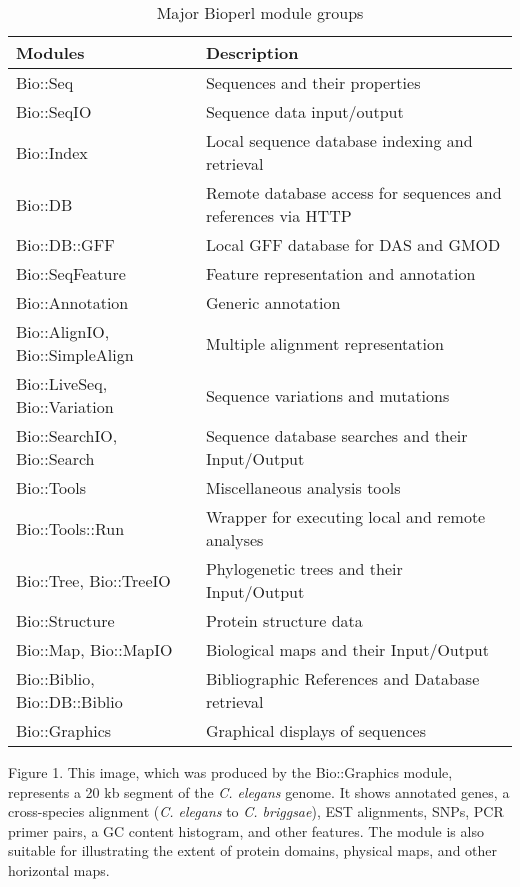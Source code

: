 \documentclass[12pt]{article}
\begin{document}
\begin{table}[h]
\begin{tabular}{|l|l|}
\hline
\textbf{Modules} & \textbf{Description} \\
\hline
Bio::Seq &  Sequences and their properties \\
Bio::SeqIO & Sequence data input/output \\
Bio::Index & Local sequence database indexing and retrieval \\ 
Bio::DB & Remote database access for sequences and references via HTTP \\
Bio::DB::GFF & Local GFF database for DAS and GMOD \\
Bio::SeqFeature & Feature representation and annotation \\
Bio::Annotation & Generic annotation \\
Bio::AlignIO, Bio::SimpleAlign & Multiple alignment representation \\
Bio::LiveSeq, Bio::Variation & Sequence variations and mutations \\
Bio::SearchIO, Bio::Search  & Sequence database searches and their Input/Output \\
Bio::Tools &  Miscellaneous analysis tools \\
Bio::Tools::Run &  Wrapper for executing local and remote analyses \\
Bio::Tree, Bio::TreeIO & Phylogenetic trees and their Input/Output  \\
Bio::Structure & Protein structure data \\
Bio::Map, Bio::MapIO & Biological maps and their Input/Output \\
Bio::Biblio, Bio::DB::Biblio & Bibliographic References and Database
retrieval \\ 
Bio::Graphics & Graphical displays of sequences \\
\hline
\end{tabular}
\caption{Major Bioperl module groups}
\label{tab:modules}
\end{table}

\newpage


Figure 1. This image, which was produced by the Bio::Graphics module,
represents a 20 kb segment of the \textit{C. elegans} genome. It shows
annotated genes, a cross-species alignment (\textit{C. elegans} to
\textit{C. briggsae}), EST alignments, SNPs, PCR primer pairs, a GC content
histogram, and other features.  The module is also suitable for
illustrating the extent of protein domains, physical maps, and other
horizontal maps.
\end{document}
